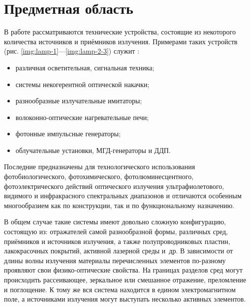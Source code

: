 \section{Предметная область}

В работе рассматриваются технические устройства, состоящие из некоторого количества источников и приёмников излучения.
Примерами таких устройств (рис. \ref{img:lamp-1}—\ref{img:lamp-2-3}) служит \cite{lighting-engineering, lasers, neodymium-glass-lasers, sarychev}:
\begin{itemize}
	\item различная осветительная, сигнальная техника;
	\item системы некогерентной оптической накачки;
	\item разнообразные излучательные имитаторы;
	\item волоконно-оптические нагревательные печи;
	\item фотонные импульсные генераторы;
	\item облучательные установки, МГД-генераторы и ДДП.
\end{itemize}



Последние предназначены для технологического использования фотобиологического, фотохимического, фотолюминесцентного, фотоэлектрического действий оптического излучения ультрафиолетового, видимого и инфракрасного спектральных диапазонов и отличаются особенным многообразием как по конструкции, так и по функциональному назначению.

В общем случае такие системы имеют довольно сложную конфигурацию, состоящую из:
отражателей самой разнообразной формы, различных сред, приёмников и источников излучения, а также полупроводниковых пластин, лакокрасочных покрытий, активной лазерной среды и~др.
В зависимости от длины волны излучения материалы перечисленных элементов по-разному проявляют свои физико-оптические свойства.
На границах разделов сред могут происходить рассеивающее, зеркальное или смешанное отражение, преломление и поглощение.
К тому же вся система находится в едином электромагнитном поле, а источниками излучения могут выступать несколько активных элементов.

